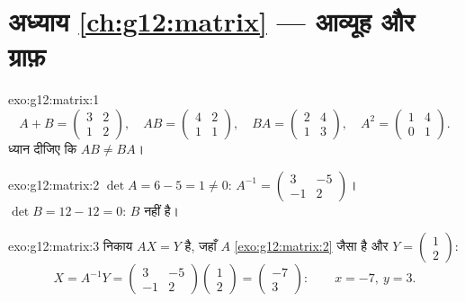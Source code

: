 \section*{अध्याय \ref{ch:g12:matrix} --- आव्यूह और ग्राफ़}

\begin{solution}{exo:g12:matrix:1}
\[
A + B = \begin{pmatrix} 3 & 2\\ 1 & 2\end{pmatrix}, \quad
AB = \begin{pmatrix} 4 & 2\\ 1 & 1\end{pmatrix}, \quad
BA = \begin{pmatrix} 2 & 4\\ 1 & 3\end{pmatrix}, \quad
A^2 = \begin{pmatrix} 1 & 4\\ 0 & 1\end{pmatrix}.
\]
ध्यान दीजिए कि $AB \neq BA$।
\end{solution}

\begin{solution}{exo:g12:matrix:2}
$\det A = 6 - 5 = 1 \neq 0$: $A^{-1} = \begin{pmatrix} 3 & -5\\ -1 & 2 \end{pmatrix}$।
$\det B = 12 - 12 = 0$: $B$  नहीं है।
\end{solution}

\begin{solution}{exo:g12:matrix:3}
निकाय $AX = Y$ है, जहाँ $A$ \cref{exo:g12:matrix:2} जैसा है और $Y = \begin{pmatrix} 1\\ 2\end{pmatrix}$:
\[
X = A^{-1}Y = \begin{pmatrix} 3 & -5\\ -1 & 2\end{pmatrix}
\begin{pmatrix} 1\\ 2\end{pmatrix}
= \begin{pmatrix} -7\\ 3\end{pmatrix}:
\qquad x = -7,\ y = 3 .
\]
\end{solution}

